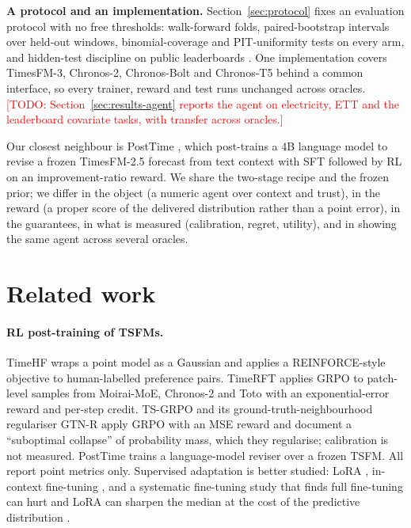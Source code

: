 \documentclass{article}
\newcommand{\todo}[1]{\textcolor{red}{[TODO: #1]}}
\begin{document}
\textbf{A protocol and an implementation.} Section~\ref{sec:protocol} fixes an evaluation protocol with no free thresholds: walk-forward folds, paired-bootstrap intervals over held-out windows, binomial-coverage and PIT-uniformity tests on every arm, and hidden-test discipline on public leaderboards \citep{aksu2024gifteval,shchur2025fevbench}. One implementation covers TimesFM-3, Chronos-2, Chronos-Bolt and Chronos-T5 behind a common interface, so every trainer, reward and test runs unchanged across oracles. \todo{Section~\ref{sec:results-agent} reports the agent on electricity, ETT and the leaderboard covariate tasks, with transfer across oracles.}

Our closest neighbour is PostTime \citep{liu2026posttime}, which post-trains a 4B language model to revise a frozen TimesFM-2.5 forecast from text context with SFT followed by RL on an improvement-ratio reward. We share the two-stage recipe and the frozen prior; we differ in the object (a numeric agent over context and trust), in the reward (a proper score of the delivered distribution rather than a point error), in the guarantees, in what is measured (calibration, regret, utility), and in showing the same agent across several oracles.

\section{Related work}
\paragraph{RL post-training of TSFMs.} TimeHF \citep{qi2025timehf} wraps a point model as a Gaussian and applies a REINFORCE-style objective to human-labelled preference pairs. TimeRFT \citep{li2026timerft} applies GRPO to patch-level samples from Moirai-MoE, Chronos-2 and Toto with an exponential-error reward and per-step credit. TS-GRPO and its ground-truth-neighbourhood regulariser GTN-R \citep{zhang2026gtnr} apply GRPO with an MSE reward and document a ``suboptimal collapse'' of probability mass, which they regularise; calibration is not measured. PostTime \citep{liu2026posttime} trains a language-model reviser over a frozen TSFM. All report point metrics only. Supervised adaptation is better studied: LoRA \citep{hu2022lora,gupta2024lora}, in-context fine-tuning \citep{das2025icf}, and a systematic fine-tuning study that finds full fine-tuning can hurt and LoRA can sharpen the median at the cost of the predictive distribution \citep{laglil2026finetuning}.
\end{document}
